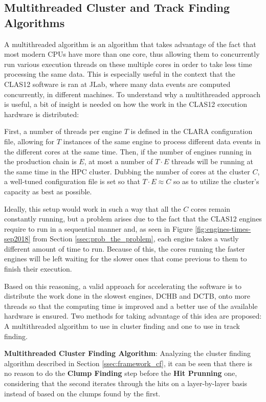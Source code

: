 \subsection{Multithreaded Cluster and Track Finding Algorithms} \label{ssec:prop_multithreaded_ctf}
A multithreaded algorithm is an algorithm that takes advantage of the fact that most modern CPUs have more than one core, thus allowing them to concurrently run various execution threads on these multiple cores in order to take less time processing the same data. %
This is especially useful in the context that the CLAS12 software is ran at JLab, where many data events are computed concurrently, in different machines.
To understand why a multithreaded approach is useful, a bit of insight is needed on how the work in the CLAS12 execution hardware is distributed:

First, a number of threads per engine $T$ is defined in the CLARA configuration file, allowing for $T$ instances of the same engine to process different data events in the different cores at the same time.
Then, if the number of engines running in the production chain is $E$, at most a number of $T\cdot E$ threads will be running at the same time in the HPC cluster.
Dubbing the number of cores at the cluster $C$, a well-tuned configuration file is set so that $T\cdot E \approx C$ so as to utilize the cluster's capacity as best as possible.

Ideally, this setup would work in such a way that all the $C$ cores remain constantly running, but a problem arises due to the fact that the CLAS12 engines require to run in a sequential manner and, as seen in Figure \ref{fig:engines-times-sep2018} from Section \ref{ssec:prob_the_problem}, each engine takes a vastly different amount of time to run.
Because of this, the cores running the faster engines will be left waiting for the slower ones that come previous to them to finish their execution.

Based on this reasoning, a valid approach for accelerating the software is to distribute the work done in the slowest engines, DCHB and DCTB, onto more threads so that the computing time is improved and a better use of the available hardware is ensured.
Two methods for taking advantage of this idea are proposed: A multithreaded algorithm to use in cluster finding and one to use in track finding.

\textbf{Multithreaded Cluster Finding Algorithm}: Analyzing the cluster finding algorithm described in Section \ref{ssec:framework_cf}, it can be seen that there is no reason to do the \textbf{Clump Finding} step before the \textbf{Hit Prunning} one, considering that the second iterates through the hits on a layer-by-layer basis instead of based on the clumps found by the first.

